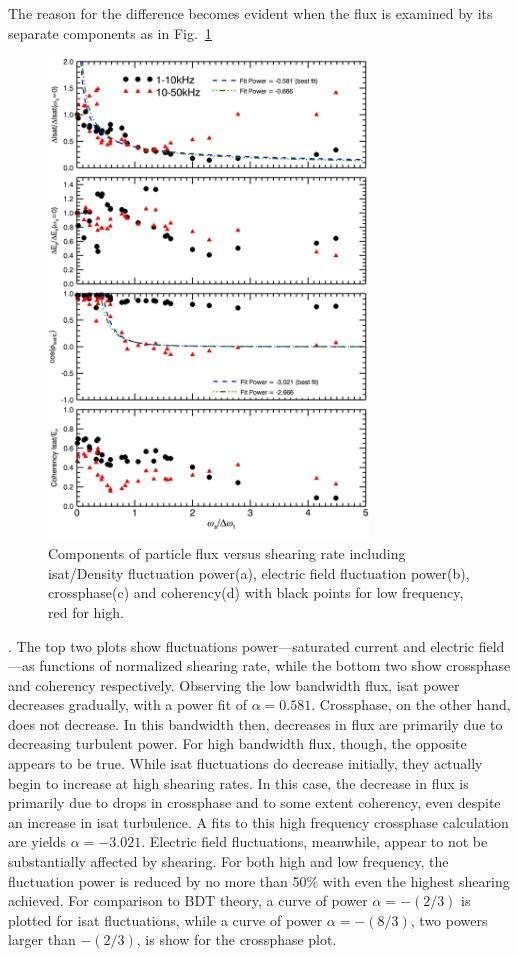 \documentclass[%
 aps,
 prl,
 amsmath,amssymb,
 reprint,%
]{revtex4-1}
\begin{document}
The reason for the difference becomes evident when the flux is examined by its separate components as in 
Fig.~\ref{fig:fluxcomps}
\begin{figure}
\begin{center}
\includegraphics[width=8.5cm]{fluxcomps.pdf}%
\end{center}
\caption{\label{fig:fluxcomps} Components of particle flux versus shearing rate including isat/Density fluctuation power(a), electric field fluctuation power(b), crossphase(c) and coherency(d) with black points for low frequency, red for high.}
\end{figure}
. The top two plots show fluctuations power---saturated current and electric field---as functions of normalized shearing rate, while the bottom two show crossphase and coherency respectively. Observing the low bandwidth flux, isat power decreases gradually, with a power fit of $\alpha = 0.581$. Crossphase, on the other hand, does not decrease. In this bandwidth then, decreases in flux are primarily due to decreasing turbulent power. For high bandwidth flux, though, the opposite appears to be true. While isat fluctuations do decrease initially, they actually begin to increase at high shearing rates. In this case, the decrease in flux is primarily due to drops in crossphase and to some extent coherency, even despite an increase in isat turbulence. A fits to this high frequency crossphase calculation are yields $\alpha = -3.021$.  Electric field fluctuations, meanwhile, appear to not be substantially affected by shearing. For both high and low frequency, the fluctuation power is reduced by no more than 50\% with even the highest shearing achieved. For comparison to BDT theory, a curve of power $\alpha = -(2/3)$ is plotted for isat fluctuations, while a curve of power $\alpha = -(8/3)$, two powers larger than $-(2/3)$, is show for the crossphase plot.
\end{document}
